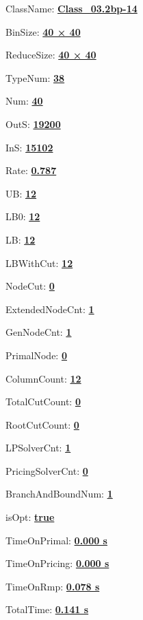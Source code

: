 \documentclass[11pt]{article}
\begin{document}
\pagestyle{empty}


ClassName: \underline{\textbf{Class_03.2bp-14}}
\par
BinSize: \underline{\textbf{40 × 40}}
\par
ReduceSize: \underline{\textbf{40 × 40}}
\par
TypeNum: \underline{\textbf{38}}
\par
Num: \underline{\textbf{40}}
\par
OutS: \underline{\textbf{19200}}
\par
InS: \underline{\textbf{15102}}
\par
Rate: \underline{\textbf{0.787}}
\par
UB: \underline{\textbf{12}}
\par
LB0: \underline{\textbf{12}}
\par
LB: \underline{\textbf{12}}
\par
LBWithCut: \underline{\textbf{12}}
\par
NodeCut: \underline{\textbf{0}}
\par
ExtendedNodeCnt: \underline{\textbf{1}}
\par
GenNodeCnt: \underline{\textbf{1}}
\par
PrimalNode: \underline{\textbf{0}}
\par
ColumnCount: \underline{\textbf{12}}
\par
TotalCutCount: \underline{\textbf{0}}
\par
RootCutCount: \underline{\textbf{0}}
\par
LPSolverCnt: \underline{\textbf{1}}
\par
PricingSolverCnt: \underline{\textbf{0}}
\par
BranchAndBoundNum: \underline{\textbf{1}}
\par
isOpt: \underline{\textbf{true}}
\par
TimeOnPrimal: \underline{\textbf{0.000 s}}
\par
TimeOnPricing: \underline{\textbf{0.000 s}}
\par
TimeOnRmp: \underline{\textbf{0.078 s}}
\par
TotalTime: \underline{\textbf{0.141 s}}
\par
\newpage


\end{document}
